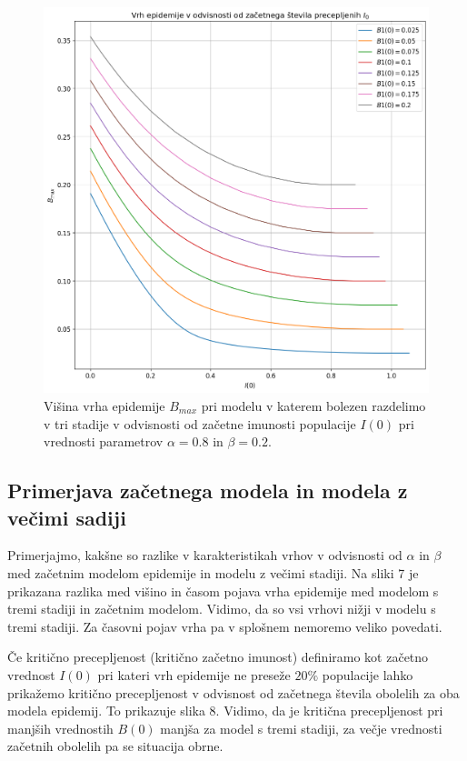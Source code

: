 \documentclass[slovene,11pt,a4paper]{article}
\begin{document}
\begin{figure}[h!]
\centering
\includegraphics[width=13.5cm]{stadiji3.png}
\caption{Višina vrha epidemije $B_{max}$ pri modelu v katerem bolezen razdelimo v tri stadije v odvisnosti od začetne imunosti populacije $I(0)$ pri vrednosti parametrov $\alpha = 0.8$ in $\beta = 0.2$.}
\end{figure}

\subsection{Primerjava začetnega modela in modela z večimi sadiji}

Primerjajmo, kakšne so razlike v karakteristikah vrhov v odvisnosti od $\alpha$ in $\beta$ med začetnim modelom epidemije in modelu z večimi stadiji. Na sliki 7 je prikazana razlika med višino in časom pojava vrha epidemije med modelom s tremi stadiji in začetnim modelom. Vidimo, da so vsi vrhovi nižji v modelu s tremi stadiji. Za časovni pojav vrha pa v splošnem nemoremo veliko povedati.

Če kritično precepljenost (kritično začetno imunost) definiramo kot začetno vrednost $I(0)$ pri kateri vrh epidemije ne preseže $20\%$ populacije lahko prikažemo kritično precepljenost v odvisnost od začetnega števila obolelih za oba modela epidemij. To prikazuje slika 8. Vidimo, da je kritična precepljenost pri manjših vrednostih $B(0)$ manjša za model s tremi stadiji, za večje vrednosti začetnih obolelih pa se situacija obrne.
\end{document}
